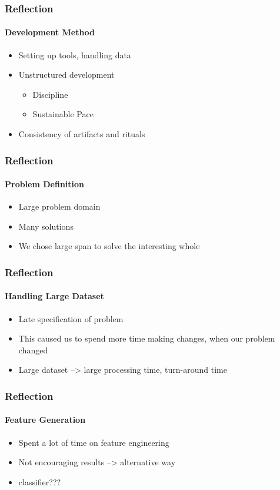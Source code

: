 \begin{frame}
    \frametitle{Reflection}
    \framesubtitle{Development Method}
    \begin{itemize}
			\item Setting up tools, handling data
			\item Unstructured development
			\begin{itemize}
				\item Discipline
				\item Sustainable Pace
			\end{itemize}
			\item Consistency of artifacts and rituals
		\end{itemize}
\end{frame}

\begin{frame}
    \frametitle{Reflection}
    \framesubtitle{Problem Definition}
    \begin{itemize}
			\item Large problem domain
			\item Many solutions
			\item We chose large span to solve the interesting whole
		\end{itemize}
\end{frame}

\begin{frame}
    \frametitle{Reflection}
    \framesubtitle{Handling Large Dataset}
    \begin{itemize}
			\item Late specification of problem
			\item This caused us to spend more time making changes, when our problem changed
			\item Large dataset --> large processing time, turn-around time
		\end{itemize}
\end{frame}

\begin{frame}
    \frametitle{Reflection}
    \framesubtitle{Feature Generation}
    \begin{itemize}
			\item Spent a lot of time on feature engineering
			\item Not encouraging results --> alternative way
			\item classifier???
		\end{itemize}
\end{frame}

